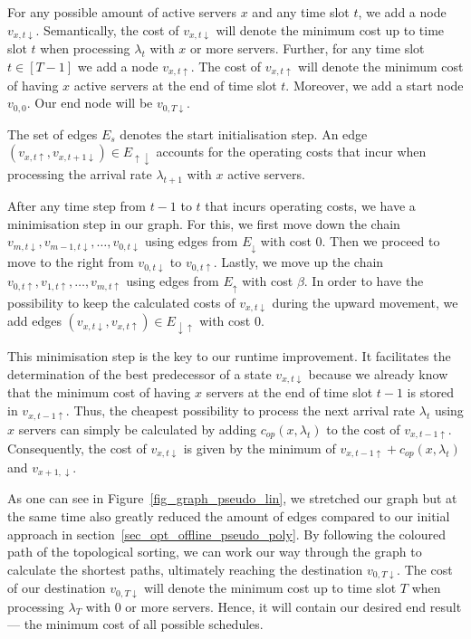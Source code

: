 \documentclass[hidelinks]{article}
\theoremstyle{plain}
\theoremstyle{definition}
\theoremstyle{rem}
\newcommand{\opcosts}{c_{op}}
\begin{document}
For any possible amount of active servers $x$ and any time slot $t$, we add a node $v_{x,t\downarrow}$. Semantically, the cost of $v_{x,t\downarrow}$ will denote the minimum cost up to time slot $t$ when processing $\lambda_t$ with $x$ or more servers. Further, for any time slot $t\in[T-1]$ we add a node $v_{x,t\uparrow}$. The cost of $v_{x,t\uparrow}$ will denote the minimum cost of having $x$ active servers at the end of time slot $t$. Moreover, we add a start node $v_{0,0}$. Our end node will be $v_{0,T\downarrow}$.

The set of edges $E_s$ denotes the start initialisation step. An edge $(v_{x,t\uparrow},v_{x,t+1\downarrow})\in E_{\uparrow\downarrow}$ accounts for the operating costs that incur when processing the arrival rate $\lambda_{t+1}$ with $x$ active servers.

After any time step from $t-1$ to $t$ that incurs operating costs, we have a minimisation step in our graph. For this, we first move down the chain $v_{m,t\downarrow},v_{m-1,t\downarrow},\ldots,v_{0,t\downarrow}$ using edges from $E_\downarrow$ with cost $0$. Then we proceed to move to the right from $v_{0,t\downarrow}$ to $v_{0,t\uparrow}$. Lastly, we move up the chain $v_{0,t\uparrow},v_{1,t\uparrow},\ldots,v_{m,t\uparrow}$ using edges from $E_\uparrow$ with cost $\beta$. In order to have the possibility to keep the calculated costs of $v_{x,t\downarrow}$ during the upward movement, we add edges $(v_{x,t\downarrow},v_{x,t\uparrow})\in E_{\downarrow\uparrow}$ with cost $0$.

This minimisation step is the key to our runtime improvement. It facilitates the determination of the best predecessor of a state $v_{x,t\downarrow}$ because we already know that the minimum cost of having $x$ servers at the end of time slot $t-1$ is stored in $v_{x,t-1\uparrow}$. Thus, the cheapest possibility to process the next arrival rate $\lambda_t$ using $x$ servers can simply be calculated by adding $\opcosts(x,\lambda_t)$ to the cost of $v_{x,t-1\uparrow}$. Consequently, the cost of $v_{x,t\downarrow}$ is given by the minimum of $v_{x,t-1\uparrow}+\opcosts(x,\lambda_t)$ and $v_{x+1,\downarrow}$.

As one can see in Figure~\ref{fig_graph_pseudo_lin}, we stretched our graph but at the same time also greatly reduced the amount of edges compared to our initial approach in section~\ref{sec_opt_offline_pseudo_poly}. By following the coloured path of the topological sorting, we can work our way through the graph to calculate the shortest paths, ultimately reaching the destination $v_{0,T\downarrow}$. The cost of our destination $v_{0,T\downarrow}$ will denote the minimum cost up to time slot $T$ when processing $\lambda_T$ with 0 or more servers. Hence, it will contain our desired end result --- the minimum cost of all possible schedules.
\end{document}
